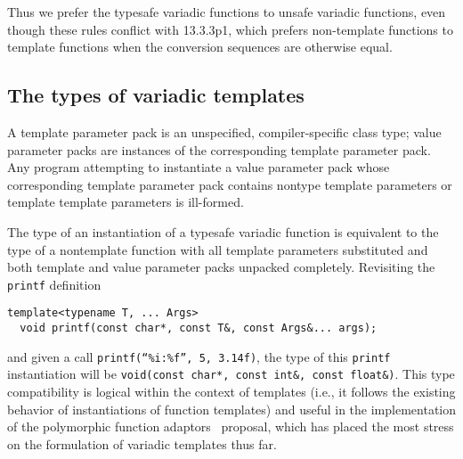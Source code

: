 \documentclass{article}
\begin{document}
Thus we prefer the typesafe variadic functions to unsafe variadic
functions, even though these rules conflict with 13.3.3p1, which
prefers non-template functions to template functions when the
conversion sequences are otherwise equal.

\subsection{The types of variadic templates}
A template parameter pack is an unspecified, compiler-specific class
type; value parameter packs are instances of the corresponding
template parameter pack. Any program attempting to instantiate a value
parameter pack whose corresponding template parameter pack contains
nontype template parameters or template template parameters is
ill-formed. 

The type of an instantiation of a typesafe variadic function is
equivalent to the type of a nontemplate function with all template
parameters substituted and both template and value parameter packs
unpacked completely. Revisiting the {\tt printf} definition

\begin{verbatim}
template<typename T, ... Args>
  void printf(const char*, const T&, const Args&... args);
\end{verbatim}

and given a call {\tt printf(``\%i:\%f'', 5, 3.14f)}, the type of this
{\tt printf} instantiation will be {\tt void(const char*, const int\&,
  const float\&)}. This type compatibility is logical within the
context of templates (i.e., it follows the existing behavior of
instantiations of function templates) and useful in the
implementation of the polymorphic function adaptors~\cite{Gregor02}
proposal, which has placed the most stress on the formulation of
variadic templates thus far.
\end{document}
